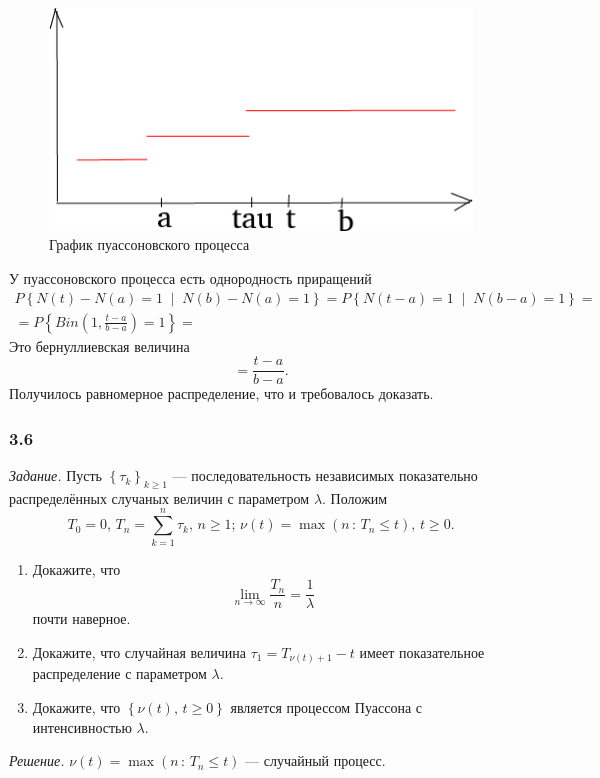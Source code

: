 \begin{figure}[h!]
  \centering
  \includegraphics[width=.4\textwidth]{./pictures/3_5.png}
  \caption{График пуассоновского процесса}
  \label{fig:35}
\end{figure}

У пуассоновского процесса есть однородность приращений
\begin{gather*}
  P \left\{
    N \left( t \right) - N \left( a \right) = 1 \; \middle| \;
    N \left( b \right) - N \left( a \right) = 1 \right\} =
  P \left\{ N \left( t - a \right) = 1 \; \middle| \; N \left( b - a \right) = 1 \right\} = \\
  = P \left\{ Bin \left( 1, \frac{t - a}{b - a} \right) = 1 \right\} =
\end{gather*}
Это бернуллиевская величина
$$= \frac{t - a}{b - a}.$$
Получилось равномерное распределение, что и требовалось доказать.

\subsubsection*{3.6}

\textit{Задание.}
Пусть $ \left\{ \tau_k \right\}_{k \geq 1}$ --- последовательность независимых показательно
распределённых случаных величин с параметром $ \lambda $.
Положим
$$T_0 = 0, \,
  T_n = \sum \limits_{k = 1}^n \tau_k, \,
  n \geq 1; \,
  \nu \left( t \right) = \max \left( n \, : \, T_n \leq t \right), \,
  t \geq 0.$$
\begin{enumerate}[label=\alph*)]
  \item Докажите, что
  $$ \lim \limits_{n \to \infty } \frac{T_n}{n} =
    \frac{1}{ \lambda }$$
  почти наверное.
  \item Докажите, что случайная величина $ \tau_1 = T_{ \nu \left( t \right) + 1} - t$
  имеет показательное распределение с параметром $ \lambda $.
  \item Докажите, что $ \left\{ \nu \left( t \right), \, t \geq 0 \right\} $
  является процессом Пуассона с интенсивностью $ \lambda $.
\end{enumerate}

\textit{Решение.}
$\nu \left( t \right) = \max \left( n \, : \, T_n \leq t \right) $ --- случайный процесс.


